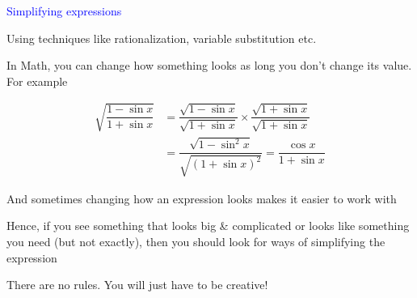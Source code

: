 \documentclass[14pt,fleqn]{extarticle}
\begin{document}
\begin{skill}
    \begin{narrow}
\textcolor{blue}{Simplifying expressions}

Using techniques like rationalization, variable substitution etc. 
         
    \end{narrow}
    
    \reason 

In Math, you can change how something looks as long you don't change its value. For example     

\begin{align}
	\sqrt{\dfrac{1-\sin x}{1+\sin x}} &= \dfrac{\sqrt{1-\sin x}}{\sqrt{1+\sin x}}\times\dfrac{\sqrt{1+\sin x}}{\sqrt{1+\sin x}} \\
	&= \dfrac{\sqrt{1-\sin^2 x}}{\sqrt{\left(1+\sin x \right)^2}} = \dfrac{\cos x}{1+\sin x} 
\end{align}

And sometimes changing how an expression looks makes it easier to work with \newline 

Hence, if you see something that looks big \& complicated or looks like something you need (but not exactly), then you should look for ways of simplifying the expression\newline 

There are no rules. You will just have to be creative! 
    
\end{skill}
\end{document}
